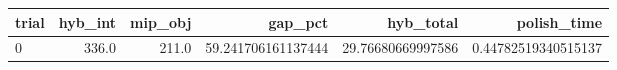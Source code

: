 \begin{tabular}{lrrrrr}
\hline
trial & hyb_int & mip_obj & gap_pct & hyb_total & polish_time \\ \hline
0 & 336.0 & 211.0 & 59.241706161137444 & 29.76680669997586 & 0.44782519340515137 \\
\hline
\end{tabular}
